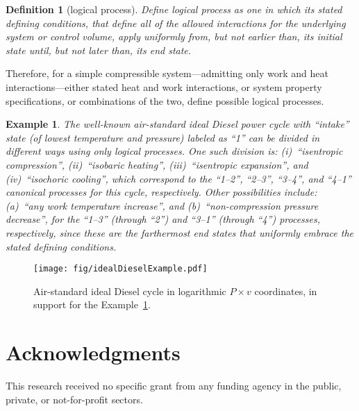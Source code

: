 \documentclass[10pt,a4paper]{article}
\newtheorem{definition}{Definition}
\newtheorem{example}{Example}
\begin{document}
\begin{multicols}{2}
    \begin{definition}[logical process]\label{def:logical.proc}
        Define logical process as one in which its stated defining conditions, that  define  all
        of the allowed interactions for the underlying system or control volume, apply uniformly
        from, but not earlier than, its initial state until, but not later than, its end state.
    \end{definition}

    Therefore,   for   a   simple   compressible   system---admitting   only   work   and   heat
    interactions---either stated heat and work interactions, or system property  specifications,
    or combinations of the two, define possible logical processes.

    \begin{example}\label{ex:ideal.Diesel}
        The well-known air-standard ideal Diesel power cycle with ``intake''  state  (of  lowest
        temperature and pressure) labeled as ``1'' can be divided in different ways  using  only
        logical processes. One such division is: (i)~``isentropic compression'', (ii)~``isobaric
        heating'',  (iii)~``isentropic  expansion'',  and  (iv)~``isochoric   cooling'',   which
        correspond to the ``1--2'', ``2--3'', ``3--4'', and  ``4--1''  canonical  processes  for
        this cycle,  respectively.  Other  possibilities  include:  (a)~``any  work  temperature
        increase'', and (b)~``non-compression pressure decrease'',  for  the  ``1--3''  (through
        ``2'') and ``3--1''  (through  ``4'')  processes,  respectively,  since  these  are  the
        farthermost end states that uniformly embrace the stated defining conditions.
    \end{example}

    \begin{figure}[H] %
        \centering
        \label{fig:cycle.Diesel}
        \texttt{[image: fig/idealDieselExample.pdf]}
        \caption{Air-standard ideal Diesel cycle in  logarithmic  $P\times  v$  coordinates,  in
            support for the Example~\ref{ex:ideal.Diesel}.}
    \end{figure}

\section*{Acknowledgments}

    This research received no specific grant from any funding agency in the public, private,  or
    not-for-profit sectors.





\end{multicols}

\end{document}
